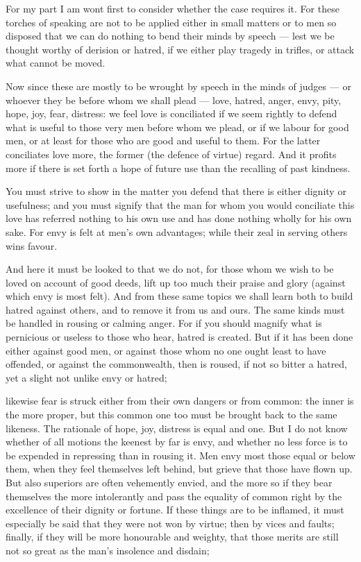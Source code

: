  For my part I am wont first to consider whether the case requires it. For these torches of speaking are not to be applied either in small matters or to men so disposed that we can do nothing to bend their minds by speech — lest we be thought worthy of derision or hatred, if we either play tragedy in trifles, or attack what cannot be moved.

 Now since these are mostly to be wrought by speech in the minds of judges — or whoever they be before whom we shall plead — love, hatred, anger, envy, pity, hope, joy, fear, distress: we feel love is conciliated if we seem rightly to defend what is useful to those very men before whom we plead, or if we labour for good men, or at least for those who are good and useful to them. For the latter conciliates love more, the former (the defence of virtue) regard. And it profits more if there is set forth a hope of future use than the recalling of past kindness.

 You must strive to show in the matter you defend that there is either dignity or usefulness; and you must signify that the man for whom you would conciliate this love has referred nothing to his own use and has done nothing wholly for his own sake. For envy is felt at men's own advantages; while their zeal in serving others wins favour.

 And here it must be looked to that we do not, for those whom we wish to be loved on account of good deeds, lift up too much their praise and glory (against which envy is most felt). And from these same topics we shall learn both to build hatred against others, and to remove it from us and ours. The same kinds must be handled in rousing or calming anger. For if you should magnify what is pernicious or useless to those who hear, hatred is created. But if it has been done either against good men, or against those whom no one ought least to have offended, or against the commonwealth, then is roused, if not so bitter a hatred, yet a slight not unlike envy or hatred;

 likewise fear is struck either from their own dangers or from common: the inner is the more proper, but this common one too must be brought back to the same likeness. The rationale of hope, joy, distress is equal and one. But I do not know whether of all motions the keenest by far is envy, and whether no less force is to be expended in repressing than in rousing it. Men envy most those equal or below them, when they feel themselves left behind, but grieve that those have flown up. But also superiors are often vehemently envied, and the more so if they bear themselves the more intolerantly and pass the equality of common right by the excellence of their dignity or fortune. If these things are to be inflamed, it must especially be said that they were not won by virtue; then by vices and faults; finally, if they will be more honourable and weighty, that those merits are still not so great as the man's insolence and disdain;

